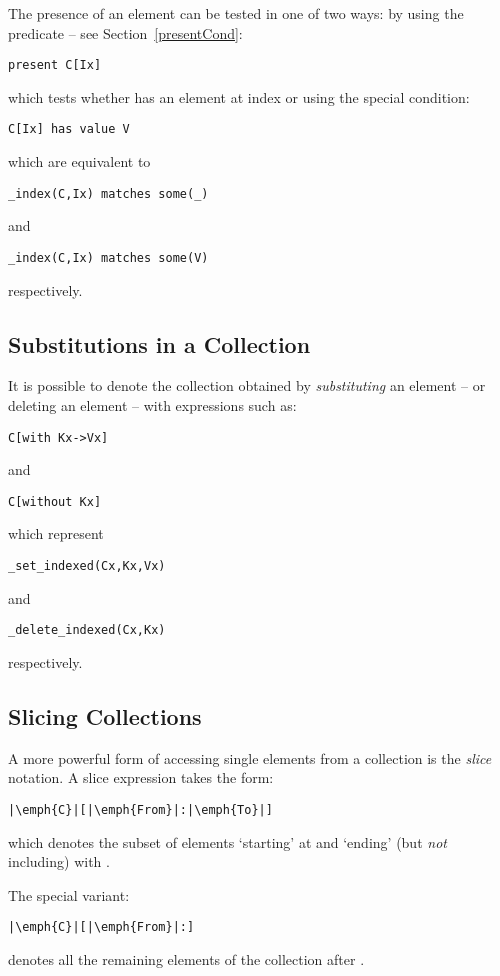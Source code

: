 The presence of an element can be tested in one of two ways: by using the  predicate -- see Section~\vref{presentCond}:
\begin{lstlisting}
present C[Ix]
\end{lstlisting}
which tests whether  has an element at index  or using the special condition:
\begin{lstlisting}
C[Ix] has value V
\end{lstlisting}
which are equivalent to
\begin{lstlisting}
_index(C,Ix) matches some(_)
\end{lstlisting}
and
\begin{lstlisting}
_index(C,Ix) matches some(V)
\end{lstlisting}
respectively.
 
\subsection{Substitutions in a Collection}
It is possible to denote the collection obtained by \emph{substituting} an element -- or deleting an element -- with expressions such as:
\begin{lstlisting}
C[with Kx->Vx]
\end{lstlisting}
and
\begin{lstlisting}
C[without Kx]
\end{lstlisting}
which represent
\begin{lstlisting}
_set_indexed(Cx,Kx,Vx)
\end{lstlisting}
and
\begin{lstlisting}
_delete_indexed(Cx,Kx)
\end{lstlisting}
respectively.

\subsection{Slicing Collections}
A more powerful form of accessing single elements from a collection is the \emph{slice} notation. A slice expression takes the form:
\begin{lstlisting}[escapechar=|]
|\emph{C}|[|\emph{From}|:|\emph{To}|]
\end{lstlisting}
which denotes the subset of elements `starting' at  and `ending' (but \emph{not} including) with .

The special variant:
\begin{lstlisting}[escapechar=|]
|\emph{C}|[|\emph{From}|:]
\end{lstlisting}
denotes all the remaining elements of the collection after .

